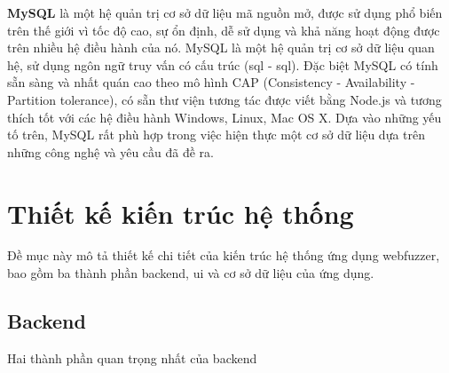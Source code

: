 \textbf{MySQL} là một hệ quản trị cơ sở dữ liệu mã nguồn mở, được sử dụng phổ biến trên thế giới vì tốc độ cao, sự ổn định, dễ sử dụng và khả năng hoạt động được trên nhiều hệ điều hành của nó. MySQL là một hệ quản trị cơ sở dữ liệu quan hệ, sử dụng ngôn ngữ truy vấn có cấu trúc (\acrlong{sql} - \acrshort{sql}). Đặc biệt MySQL có tính sẵn sàng và nhất quán cao theo mô hình CAP (Consistency - Availability - Partition tolerance), có sẵn thư viện tương tác được viết bằng Node.js và tương thích tốt với các hệ điều hành Windows, Linux, Mac OS X. Dựa vào những yếu tố trên, MySQL rất phù hợp trong việc hiện thực một cơ sở dữ liệu dựa trên những công nghệ và yêu cầu đã đề ra.
\section{Thiết kế kiến trúc hệ thống}
Đề mục này mô tả thiết kế chi tiết của kiến trúc hệ thống ứng dụng webfuzzer, bao gồm ba thành phần backend, \acrshort{ui} và cơ sở dữ liệu của ứng dụng.
\subsection{Backend}
Hai thành phần quan trọng nhất của backend 
